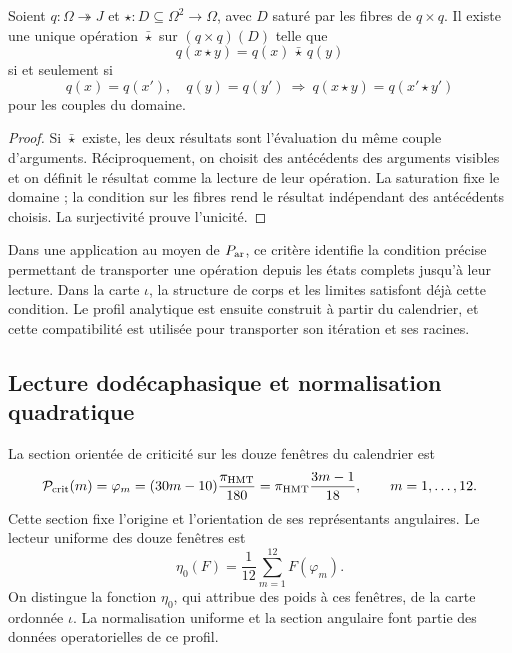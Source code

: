 \begin{proposition}
\label{hmtfg:criterio-descenso}
Soient \(q:\Omega\twoheadrightarrow J\) et
\(\star:D\subseteq\Omega^2\to\Omega\), avec \(D\) saturé par les fibres de \(q\times q\). Il existe une unique opération \(\bar\star\) sur \((q\times q)(D)\) telle que
\[
 q(x\star y)=q(x)\,\bar\star\,q(y)
\]
si et seulement si
\[
 q(x)=q(x'),\quad q(y)=q(y')
 \ \Longrightarrow\ q(x\star y)=q(x'\star y')
\]
pour les couples du domaine.
\end{proposition}
\begin{proof}
Si \(\bar\star\) existe, les deux résultats sont l’évaluation du même couple d’arguments. Réciproquement, on choisit des antécédents des arguments visibles et on définit le résultat comme la lecture de leur opération. La saturation fixe le domaine ; la condition sur les fibres rend le résultat indépendant des antécédents choisis. La surjectivité prouve l’unicité.
\end{proof}

Dans une application au moyen de \(P_{\rm ar}\), ce critère identifie la condition précise permettant de transporter une opération depuis les états complets jusqu’à leur lecture. Dans la carte \(\iota\), la structure de corps et les limites satisfont déjà cette condition. Le profil analytique est ensuite construit à partir du calendrier, et cette compatibilité est utilisée pour transporter son itération et ses racines.

\subsection{Lecture dodécaphasique et normalisation quadratique}
\label{hmtfg:perfil-dodecafasico}

La section orientée de criticité sur les douze fenêtres du calendrier est
\[
 \mathcal P_{\rm crit}(m)=\varphi_m
   =(30m-10)\frac{\pi_{\rm HMT}}{180}
   =\pi_{\rm HMT}\frac{3m-1}{18},\qquad m=1,\ldots,12.
\]
Cette section fixe l’origine et l’orientation de ses représentants angulaires. Le lecteur uniforme des douze fenêtres est
\[
 \eta_0(F)=\frac1{12}\sum_{m=1}^{12}F(\varphi_m).
\]
On distingue la fonction \(\eta_0\), qui attribue des poids à ces fenêtres, de la carte ordonnée \(\iota\). La normalisation uniforme et la section angulaire font partie des données operatorielles de ce profil.

